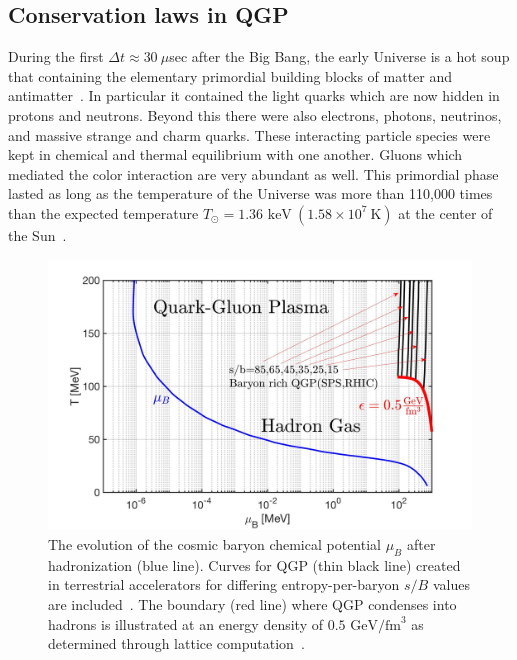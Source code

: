 \documentclass[universe,article,submit,moreauthors,pdftex,a4paper]{Definitions/mdpi}
\newcommand{\GeV}{\text{ GeV}}
\newcommand{\keV}{\text{ keV}}
\begin{document}
\subsection{Conservation laws in QGP}\label{sec:Conservation}
\noindent During the first $\Delta t\approx30\ \mu$sec after the Big Bang, the early Universe is a hot soup that containing the elementary primordial building blocks of matter and antimatter~\cite{Rafelski:2015cxa}. In particular it contained the light quarks which are now hidden in protons and neutrons. Beyond this there were also electrons, photons, neutrinos, and massive strange and charm quarks. These interacting particle species were kept in chemical and thermal equilibrium with one another. Gluons which mediated the color interaction are very abundant as well. This primordial phase lasted as long as the temperature of the Universe was more than 110,000 times than the expected temperature $T_{\odot}=1.36\keV\ (1.58\times10^{7}\ \mathrm{K})$ at the center of the Sun~\cite{Castellani:1996cm}.

\begin{figure}[ht]
 \centering
 \includegraphics[width=\textwidth]{./plots/QGPDiagram_A.jpg}
 \caption{ The evolution of the cosmic baryon chemical potential $\mu_{B}$ after hadronization (blue line). Curves for QGP (thin black line) created in terrestrial accelerators for differing entropy-per-baryon $s/B$ values are included~\cite{Rafelski:1987nv}. The boundary (red line) where QGP condenses into hadrons is illustrated at an energy density of $0.5\GeV/\mathrm{fm}^{3}$ as determined through lattice computation~\cite{HotQCD:2014kol}.}
 \label{phaseQGP} 
\end{figure}
\end{document}
